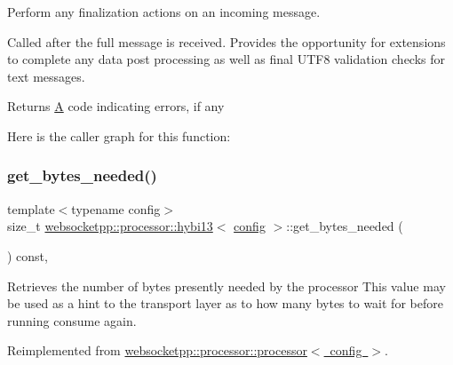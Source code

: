 Perform any finalization actions on an incoming message. 

Called after the full message is received. Provides the opportunity for extensions to complete any data post processing as well as final U\+T\+F8 validation checks for text messages.

\begin{DoxyReturn}{Returns}
\mbox{\hyperlink{struct_a}{A}} code indicating errors, if any 
\end{DoxyReturn}
Here is the caller graph for this function\+:
\mbox{\label{classwebsocketpp_1_1processor_1_1hybi13_a0e7fbb706a341f7d125c27e7ef001d92}} 
\subsubsection{\texorpdfstring{get\+\_\+bytes\+\_\+needed()}{get\_bytes\_needed()}}
{\footnotesize\ttfamily template$<$typename config$>$ \\
size\+\_\+t \mbox{\hyperlink{classwebsocketpp_1_1processor_1_1hybi13}{websocketpp\+::processor\+::hybi13}}$<$ \mbox{\hyperlink{classconfig}{config}} $>$\+::get\+\_\+bytes\+\_\+needed (\begin{DoxyParamCaption}{ }\end{DoxyParamCaption}) const\hspace{0.3cm}{\ttfamily [inline]}, {\ttfamily [virtual]}}

Retrieves the number of bytes presently needed by the processor This value may be used as a hint to the transport layer as to how many bytes to wait for before running consume again. 

Reimplemented from \mbox{\hyperlink{classwebsocketpp_1_1processor_1_1processor_a141bc4565dc27e047df1251f117543b4}{websocketpp\+::processor\+::processor$<$ config $>$}}.

\mbox{\label{classwebsocketpp_1_1processor_1_1hybi13_a8fe09bba8cbe2821ef5c7cf3fd9573cd}} 
